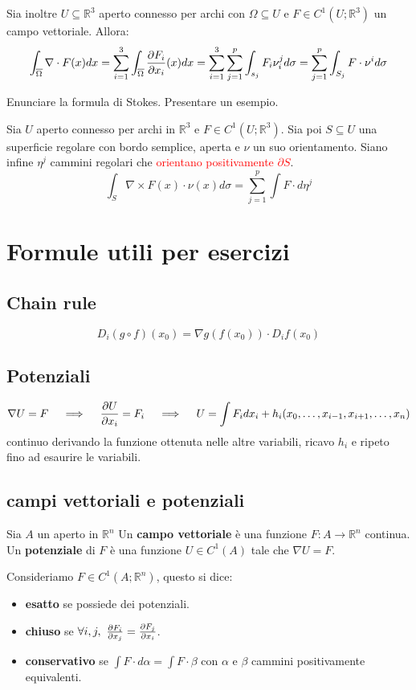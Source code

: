 \documentclass{exam}
\newcommand{\R}[0]{\mathbb{R}}
\newcommand{\err}[1]{\textcolor{red}{#1}}
\begin{document}
\begin{questions}
\begin{solution}
    Sia inoltre $U\subseteq \R^3$ aperto connesso per archi con $\Omega \subseteq U$ e $F \in C^1(U; \R^3)$ un campo vettoriale. Allora:
    \[ 
    \int_{\overline{\Omega}} \nabla \cdot F(x) dx = \sum_{i=1}^3 \int_{\overline{\Omega}} \pdv{F_i}{x_i} (x) dx = \sum_{i=1}^3 \sum_{j=1}^p \int_{s_j}F_i \nu^j_i d \sigma = \sum_{j=1}^p \int_{S_j} F \cdot \nu^i d\sigma
    \]
\end{solution}
\question Enunciare la formula di Stokes. Presentare un esempio.
\begin{solution}
    Sia $U$ aperto connesso per archi in $\R^3$ e $F\in C^1(U;\R^3)$.
    Sia poi $S \subseteq U$ una superficie regolare con bordo semplice, aperta e $\nu$ un suo orientamento.
    Siano infine $\eta^j$ cammini regolari che \err{orientano positivamente $\partial S$}.
    \[
    \int_S \nabla \times F (x)\cdot\nu(x)  d\sigma = \sum_{j=1}^p \int F \cdot d\eta^j 
    \]
\end{solution}    
\end{questions}

\appendix

\section*{Formule utili per esercizi}
\subsection*{Chain rule}
\[
D_i(g \circ f) (x_0) = \nabla g(f(x_0)) \cdot D_i f(x_0)
\]

\subsection*{Potenziali}
\[
\nabla U = F \quad \implies \quad \pdv{U}{x_i} = F_i \quad \implies \quad U = \int F_i dx_i + h_i(x_0, \dots, x_{i-1}, x_{i+1}, \dots, x_n)
\]
continuo derivando la funzione ottenuta nelle altre variabili, ricavo $h_i$ e ripeto fino ad esaurire le variabili.

\subsection*{campi vettoriali e potenziali}
Sia $A$ un aperto in $\R^n$
Un \textbf{campo vettoriale} è una funzione $F: A \to \R^n$ continua.
Un \textbf{potenziale} di $F$ è una funzione $U \in C^1(A)$ tale che $\nabla U = F$.


Consideriamo $F \in C^1(A;\R^n)$, questo si dice:
\begin{itemize}
    \item \textbf{esatto} se possiede dei potenziali.
    \item \textbf{chiuso} se $\forall i,j, \ \pdv{F_i}{x_j} = \pdv{F_j}{x_i}$.
    \item \textbf{conservativo} se $ \int F \cdot d\alpha = \int F \cdot \beta$ con $\alpha$ e $\beta$ cammini positivamente equivalenti.
\end{itemize}
\end{document}
